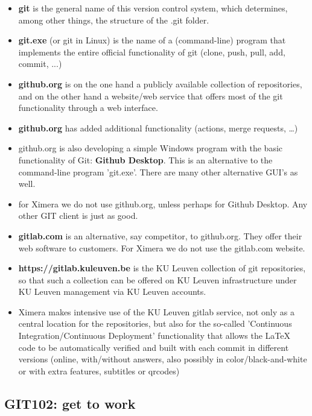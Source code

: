 \documentclass{ximera}
\begin{document}
\begin{itemize}
\item \textbf{git} is the general name of this version control system, which determines, among other things, the structure of the .git folder.
\item \textbf{git.exe} (or git in Linux) is the name of a (command-line) program that implements the entire official functionality of git (clone, push, pull, add, commit, ...)
\item \textbf{github.org} is on the one hand a publicly available collection of repositories, and on the other hand a website/web service that offers most of the git functionality through a web interface.
\item \textbf{github.org} has added additional functionality (actions, merge requests,  \ldots )
\item github.org is also developing a simple Windows program with the basic functionality of Git: \textbf{Github Desktop}. This is an alternative to the command-line program 'git.exe'. There are many other alternative GUI's as well.
\item for Ximera we do not use github.org, unless perhaps for Github Desktop. Any other GIT client is just as good.
\item \textbf{gitlab.com} is an alternative, say competitor, to github.org. They offer their web software to customers. For Ximera we do not use the gitlab.com website.
\item \textbf{https://gitlab.kuleuven.be} is the KU Leuven collection of git repositories, so that such a collection can be offered on KU Leuven infrastructure under KU Leuven management via KU Leuven accounts.
\item Ximera makes intensive use of the KU Leuven gitlab service, not only as a central location for the repositories, but also for the so-called 'Continuous Integration/Continuous Deployment' functionality that allows the LaTeX code to be automatically verified and built with each commit in different versions (online, with/without answers, also possibly in color/black-and-white or with extra features, subtitles or qrcodes)
\end{itemize}


\subsection{GIT102: get to work}
\end{document}
